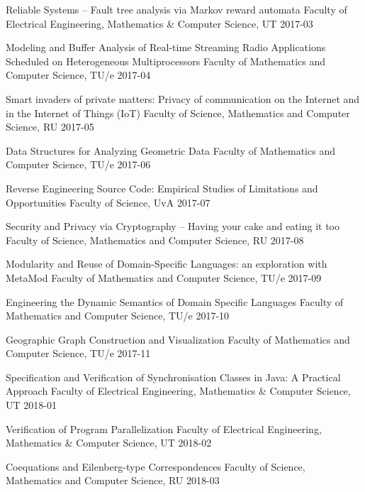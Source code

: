 \begin{multicols}{2}
         {Reliable Systems -- Fault tree analysis via Markov reward automata}
         {Faculty of Electrical Engineering, Mathematics \& Computer Science, UT}
         {2017-03}

         {Modeling and Buffer Analysis of Real-time Streaming Radio Applications Scheduled on Heterogeneous Multiprocessors}
         {Faculty of Mathematics and Computer Science, TU/e}
         {2017-04}

         {Smart invaders of private matters: Privacy of communication on the Internet and in the Internet of Things (IoT)}
         {Faculty of Science, Mathematics and Computer Science, RU}
         {2017-05}

         {Data Structures for Analyzing Geometric Data}
         {Faculty of Mathematics and Computer Science, TU/e}
         {2017-06}

         {Reverse Engineering Source Code: Empirical Studies of Limitations and Opportunities}
         {Faculty of Science, UvA}
         {2017-07}

         {Security and Privacy via Cryptography -- Having your cake and eating it too}
         {Faculty of Science, Mathematics and Computer Science, RU}
         {2017-08}

         {Modularity and Reuse of Domain-Specific Languages: an exploration with MetaMod}
         {Faculty of Mathematics and Computer Science, TU/e}
         {2017-09}

         {Engineering the Dynamic Semantics of Domain Specific Languages}
         {Faculty of Mathematics and Computer Science, TU/e}
         {2017-10}

         {Geographic Graph Construction and Visualization}
         {Faculty of Mathematics and Computer Science, TU/e}
         {2017-11}

         {Specification and Verification of Synchronisation Classes in Java: A Practical Approach}
         {Faculty of Electrical Engineering, Mathematics \& Computer Science, UT}
         {2018-01}

         {Verification of Program Parallelization}
         {Faculty of Electrical Engineering, Mathematics \& Computer Science, UT}
         {2018-02}

         {Coequations and Eilenberg-type Correspondences}
         {Faculty of Science, Mathematics and Computer Science, RU}
         {2018-03}


\end{multicols}
